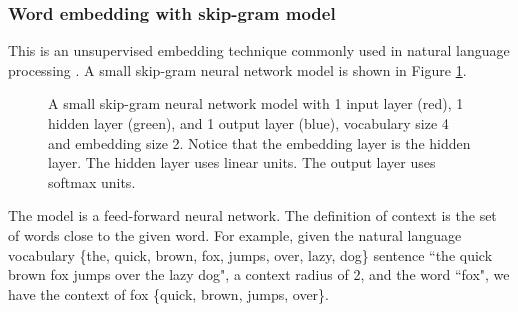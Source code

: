 \documentclass[11pt,twocolumn]{article}
\begin{document}
\subsubsection{Word embedding with skip-gram model}
This is an unsupervised embedding technique commonly used in natural language processing \cite{mikolov2013linguistic}.
A small skip-gram neural network model is shown in Figure \ref{fig:skipGram}.
\begin{figure}[!ht]
	\centering
	\newcommand{\layersep}{2cm}
	\newcommand{\vocabularySize}{4}
	\newcommand{\embeddingSize}{2}
	\caption{
		A small skip-gram neural network model with
		1 input layer (red), 1 hidden layer (green), and 1 output layer (blue),
		vocabulary size 4 and embedding size 2.
		Notice that the embedding layer is the hidden layer.
		The hidden layer uses linear units.
		The output layer uses softmax units.
	}
	\label{fig:skipGram}
\end{figure}
The model is a feed-forward neural network.
The definition of context is the set of words close to the given word.
For example, given the natural language vocabulary \{the, quick, brown, fox, jumps, over, lazy, dog\} sentence ``the quick brown fox jumps over the lazy dog", a context radius of 2, and the word ``fox", we have the context of fox \{quick, brown, jumps, over\}.
\end{document}
